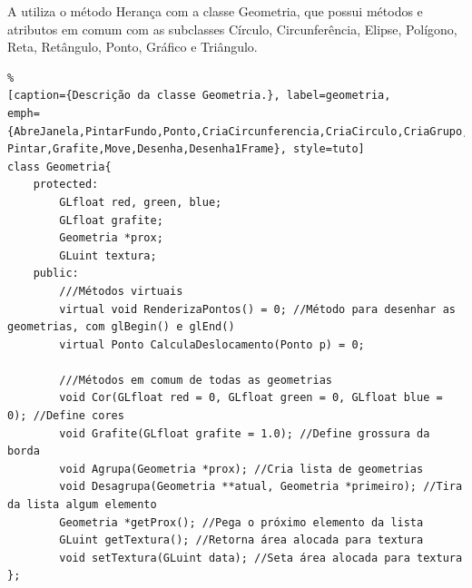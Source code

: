 A \playAPC{} utiliza o método Herança com a classe Geometria, que possui métodos e atributos em comum com as subclasses Círculo, Circunferência, Elipse, Polígono, Reta, Retângulo, Ponto, Gráfico e Triângulo.
\begin{lstlisting}%
[caption={Descrição da classe Geometria.}, label=geometria,
emph={AbreJanela,PintarFundo,Ponto,CriaCircunferencia,CriaCirculo,CriaGrupo,%
Pintar,Grafite,Move,Desenha,Desenha1Frame}, style=tuto]
class Geometria{
    protected:
        GLfloat red, green, blue;
        GLfloat grafite;
        Geometria *prox;
        GLuint textura;
    public:
        ///Métodos virtuais
        virtual void RenderizaPontos() = 0; //Método para desenhar as geometrias, com glBegin() e glEnd()
        virtual Ponto CalculaDeslocamento(Ponto p) = 0;

        ///Métodos em comum de todas as geometrias
        void Cor(GLfloat red = 0, GLfloat green = 0, GLfloat blue = 0); //Define cores
        void Grafite(GLfloat grafite = 1.0); //Define grossura da borda
        void Agrupa(Geometria *prox); //Cria lista de geometrias
        void Desagrupa(Geometria **atual, Geometria *primeiro); //Tira da lista algum elemento
        Geometria *getProx(); //Pega o próximo elemento da lista
        GLuint getTextura(); //Retorna área alocada para textura
        void setTextura(GLuint data); //Seta área alocada para textura
};
\end{lstlisting}


